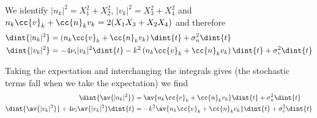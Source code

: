 \documentclass[10pt,a4paper]{article}
\begin{document}
We identify $|n_k|^2=X_1^2+X_2^2$, $|v_k|^2=X_3^2+X_4^2$ and
$n_k\cc{v}_k+\cc{n}_kv_k=2(X_1X_3+X_2X_4)$
and therefore
\begin{align}
\dint{|n_k|^2} &= \left(n_k\cc{v}_k+\cc{n}_kv_k\right)\dint{t}+
\sigma_n^2\dint{t}\\
\dint{|v_k|^2} &= -4\nu_i|v_k|^2\dint{t}-
k^2\left(n_k\cc{v}_k+\cc{n}_kv_k\right)\dint{t}+\sigma_v^2\dint{t}
\end{align}

Taking the expectation and interchanging the integrals
gives (the stochastic terms fall when we take the expectation)
we find
\begin{align}
\dint{\av{|n_k|^2}} &= \av{n_k\cc{v}_k+\cc{n}_kv_k}\dint{t}+
\sigma_n^2\dint{t}\\
\dint{\av{|v_k|^2}}+4\nu_i\av{|v_k|^2}\dint{t} &= -
k^2\av{n_k\cc{v}_k+\cc{n}_kv_k}\dint{t}+\sigma_v^2\dint{t}
\end{align}
\end{document}
